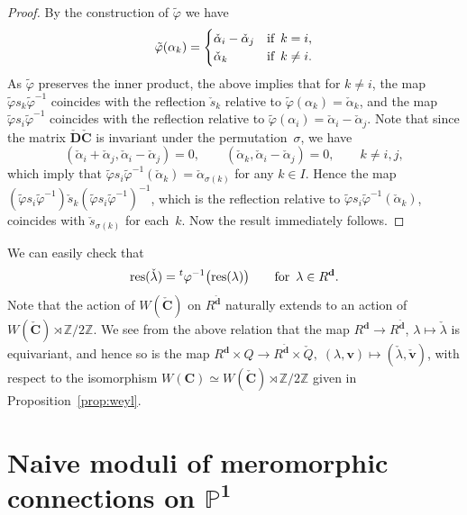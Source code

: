 \documentclass[pdftex]{sigma}
\numberwithin{equation}{section}
\theoremstyle{definition}
\newcommand{\propref}[1]{Proposition~\ref{#1}}
\newcommand{\Z}{\mathbb{Z}} %
\newcommand{\bbP}{\mathbb{P}} %
\newcommand{\bD}{\mathbf{D}} %
\newcommand{\bC}{\mathbf{C}} %
\newcommand{\bv}{\mathbf{v}}
\newcommand{\res}{\operatorname*{res}}
\newcommand{\ved}{\mathbf{d}}
\newcommand{\hquad}{\hspace{.5em}}
\begin{document}
\begin{proof}
By the construction of $\tilde{\varphi}$ we have
\[
\tilde{\varphi}(\alpha_k)=
\begin{cases}
\check{\alpha}_i-\check{\alpha}_j & \text{if}\hquad k=i, \\
\check{\alpha}_k & \text{if}\hquad k\neq i.
\end{cases}
\]
As $\tilde{\varphi}$ preserves the inner product,
the above implies that for $k \neq i$,
the map $\tilde{\varphi}s_k\tilde{\varphi}^{-1}$ coincides with
the ref\/lection $\check{s}_k$ relative to
$\tilde{\varphi}(\alpha_k)=\check{\alpha}_k$,
and the map $\tilde{\varphi}s_i\tilde{\varphi}^{-1}$ coincides with
the ref\/lection relative to
$\tilde{\varphi}(\alpha_i)=\check{\alpha}_i -\check{\alpha}_j$.
Note that since the matrix $\check{\bD} \check{\bC}$ is invariant
under the permutation~$\sigma$,
we have
\[
(\check{\alpha}_i+\check{\alpha}_j,\check{\alpha}_i-\check{\alpha}_j)=0,\qquad
(\check{\alpha}_k,\check{\alpha}_i-\check{\alpha}_j)=0,
\qquad  k \neq i,j,
\]
which imply that
$\tilde{\varphi}s_i\tilde{\varphi}^{-1}(\check{\alpha}_k)
=\check{\alpha}_{\sigma(k)}$
for any $k \in I$.
Hence the map
$(\tilde{\varphi}s_i\tilde{\varphi}^{-1})\check{s}_k (\tilde{\varphi}s_i\tilde{\varphi}^{-1})^{-1}$,
which is the ref\/lection relative to
$\tilde{\varphi}s_i\tilde{\varphi}^{-1}(\check{\alpha}_k)$,
coincides with $\check{s}_{\sigma(k)}$ for each~$k$.
Now the result immediately follows.
\end{proof}

We can easily check that
\[
\res (\check{\lambda}) = {}^t\varphi^{-1} \bigl( \res (\lambda) \bigr)
\qquad \text{for}\hquad \lambda \in R^\ved.
\]
Note that
the action of $W(\check{\bC})$ on $R^{\check{\ved}}$
naturally extends to an action of
$W(\check{\bC}) \rtimes \Z/2\Z$.
We see from the above relation
that the map $R^\ved \to R^{\check{\ved}}$, $\lambda \mapsto \check{\lambda}$
is equivariant, and hence so is the map
$R^\ved \times Q \to R^{\check{\ved}} \times \check{Q},\;
(\lambda,\bv) \mapsto (\check{\lambda},\check{\bv})$,
with respect to the isomorphism
$W(\bC) \simeq W(\check{\bC}) \rtimes \Z/2\Z$ given in \propref{prop:weyl}.

\section[Naive moduli of meromorphic connections on $\bbP^1$]{Naive moduli of meromorphic connections on $\boldsymbol{\bbP^1}$}\label{sec:moduli}
\end{document}
